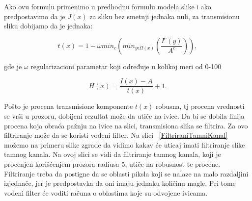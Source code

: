 \documentclass[a4paper,12pt,titlepage]{article}
\begin{document}
Ako ovu formulu primenimo u predhodnu formulu modela slike i ako predpostavimo da je $J(x)$ za sliku bez smetnji jednaka nuli, za transmisionu sliku dobijamo da je jednaka:

\begin{equation}\label{eq:haze3}
t(x) = 1 - \omega min_c ( min_{y \epsilon \Omega (x)} (\dfrac{I^c(y)}{A^c})),
\end{equation}

gde je $\omega$ regularizacioni parametar koji određuje u kolikoj meri od 0-100 %

\begin{equation}\label{eq:haze3}
H(x) = \dfrac{I(x) - A}{t(x)} + 1.
\end{equation}

Pošto je procena transmisione komponente $t(x)$ robusna, tj procena vrednosti  se vrši u prozoru, dobijeni rezultat može da utiče na ivice. Da bi se dobila finija procena koja obraća pažnju na ivice na slici, transmisiona slika se filtrira. Za ovo filtriranje može da se koristi vođeni filter. Na slici ~\ref{FiltriraniTamniKanal} možemo na primeru slike zgrade da vidimo kakav će uticaj imati filtriranje slike tamnog kanala. Na ovoj slici se vidi da filtriranje tamnog kanala, koji je procenjen korišćenjem prozora radiusa 5, utiče na robusnost te procene. Filtriranje treba da postigne da se oblasti piksla koji se nalaze na malo razdaljini izjednače, jer je predpostavka da oni imaju jednaku količinu magle. Pri tome vođeni filter će voditi računa o oblastima koje su odvojene ivicama. 
\end{document}
